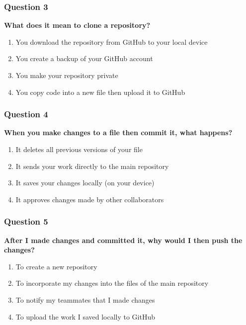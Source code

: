 \documentclass[
  letterpaper,
  DIV=11,
  numbers=noendperiod]{scrartcl}
\begin{document}
\subsubsection{Question 3}

\textbf{What does it mean to clone a repository?}

\begin{enumerate}
\def\labelenumi{\alph{enumi}.}
\item
  You download the repository from GitHub to your local device
\item
  You create a backup of your GitHub account
\item
  You make your repository private
\item
  You copy code into a new file then upload it to GitHub
\end{enumerate}

\subsubsection{Question 4}

\textbf{When you make changes to a file then commit it, what happens?}

\begin{enumerate}
\def\labelenumi{\alph{enumi}.}
\item
  It deletes all previous versions of your file
\item
  It sends your work directly to the main repository
\item
  It saves your changes locally (on your device)
\item
  It approves changes made by other collaborators
\end{enumerate}

\subsubsection{Question 5}

\textbf{After I made changes and committed it, why would I then push the
changes?}

\begin{enumerate}
\def\labelenumi{\alph{enumi}.}
\item
  To create a new repository
\item
  To incorporate my changes into the files of the main repository
\item
  To notify my teammates that I made changes
\item
  To upload the work I saved locally to GitHub
\end{enumerate}
\end{document}
